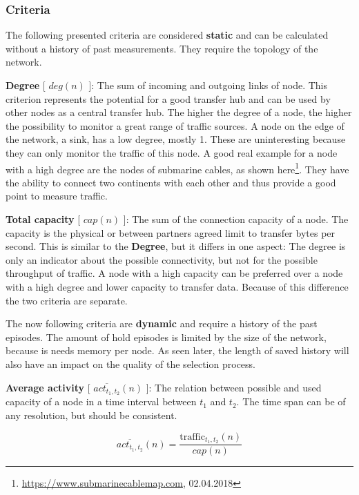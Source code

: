 \documentclass[thesis.tex]{subfiles}
\begin{document}
\subsubsection{Criteria} \label{sec:main:selectionPhase:criteria}
The following presented criteria are considered \textbf{static} and can be calculated without a history of past measurements. They require the topology of the network.

\textbf{Degree} [ $deg(n)$ ]: The sum of incoming and outgoing links of node. This criterion represents the potential for a good transfer hub and can be used by other nodes as a central transfer hub. The higher the degree of a node, the higher the possibility to monitor a great range of traffic sources. A node on the edge of the network, a sink, has a low degree, mostly 1. These are uninteresting because they can only monitor the traffic of this node. A good real example for a node with a high degree are the nodes of submarine cables, as shown here\footnote{\url{https://www.submarinecablemap.com}, 02.04.2018}. They have the ability to connect two continents with each other and thus provide a good point to measure traffic.

\textbf{Total capacity} [ $cap(n)$ ]: The sum of the connection capacity of a node. The capacity is the physical or between partners agreed limit to transfer bytes per second. This is similar to the \textbf{Degree}, but it differs in one aspect: The degree is only an indicator about the possible connectivity, but not for the possible throughput of traffic. A node with a high capacity can be preferred over a node with a high degree and lower capacity to transfer data. Because of this difference the two criteria are separate.

The now following criteria are \textbf{dynamic} and require a history of the past episodes. The amount of hold episodes is limited by the size of the network, because is needs memory per node. As seen later, the length of saved history will also have an impact on the quality of the selection process. 

\textbf{Average activity} [ $\overline{act_{t_1,t_2}}(n)$ ]: The relation between possible and used capacity of a node in a time interval between $t_1$ and $t_2$. The time span can be of any resolution, but should be consistent. 

\begin{equation}
\overline{act_{t_1,t_2}}(n) = \frac{\text{traffic}_{t_1,t_2}(n)}{cap(n)}
\end{equation}
\end{document}
